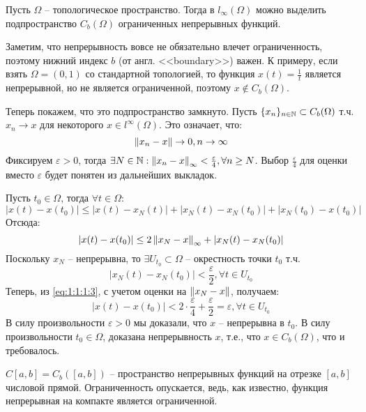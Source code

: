 \documentclass[../main.tex]{subfiles}
\begin{document}
\begin{example}
	Пусть $\Omega$ -- топологическое пространство. Тогда в $l_\infty (\Omega)$ можно выделить подпространство $C_b (\Omega)$ ограниченных непрерывных функций. 
	
	Заметим, что непрерывность вовсе не обязательно влечет ограниченность, поэтому нижний индекс $b$ (от англ. <<boundary>>) важен. К примеру, если взять $\Omega = (0, 1)$ со стандартной топологией, то функция $x(t) = \frac{1}{t}$ является непрерывной, но не является ограниченной, поэтому $x \notin C_b (\Omega)$.
	
	Теперь покажем, что это подпространство замкнуто. Пусть $\{x_n\}_{n\in\mathbb{N}} \subset C_b (\Omega)$ т.ч. $x_n \to x$ для некоторого $x \in l^\infty (\Omega)$. Это означает, что:
	\begin{equation*}
		\left\| x_n - x \right\| \to 0, n \to \infty
	\end{equation*}
	Фиксируем $\varepsilon > 0$, тогда $\exists N \in \mathbb{N}: \left\| x_n - x \right\|_\infty < \frac{\varepsilon}{4}, \forall n \geq N$. Выбор $\frac{\varepsilon}{4}$ для оценки вместо $\varepsilon$ будет понятен из дальнейших выкладок. 
	
	Пусть $t_0 \in \Omega$, тогда $\forall t \in \Omega$:
	\begin{equation*}
		|x(t) - x(t_0)| \leq |x(t) - x_N (t)| + |x_N (t) - x_N (t_0)| + |x_N(t_0) - x(t_0)|
	\end{equation*}
	Отсюда:
	\begin{equation}\label{eq:1:1:1:3}
		|x(t) - x(t_0)| \leq 2\left\| x_N - x \right\|_\infty + |x_N (t) - x_N (t_0)|
	\end{equation}
	Поскольку $x_N$ -- непрерывна, то $\exists U_{t_0} \subset \Omega$ -- окрестность точки $t_0$ т.ч. 
	$$|x_N (t) - x_N (t_0)| < \frac{\varepsilon}{2}, \forall t \in U_{t_0}$$
	Теперь, из \eqref{eq:1:1:1:3}, с учетом оценки на $\left\| x_N - x \right\|$, получаем:
	\begin{equation*}
		|x(t) - x(t_0)| < 2 \cdot \frac{\varepsilon}{4} + \frac{\varepsilon}{2} = \varepsilon, \forall t \in U_{t_0}
	\end{equation*}
	В силу произвольности $\varepsilon > 0$ мы доказали, что $x$ -- непрерывна в $t_0$. В силу произвольности $t_0 \in \Omega$, доказана непрерывность $x$, т.е., что $x \in C_b (\Omega)$, что и требовалось.
\end{example}

\begin{example}
	$C[a, b] = C_b ([a, b])$ -- пространство непрерывных функций на отрезке $[a, b]$ числовой прямой. Ограниченность опускается, ведь, как известно, функция непрерывная на компакте является ограниченной.
\end{example}
\end{document}
